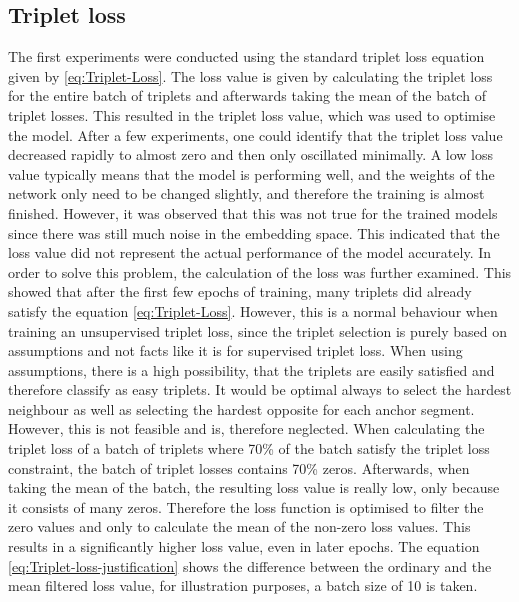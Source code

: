 \subsection{Triplet loss}
\label{sub:Results-Triplet-Loss}
The first experiments were conducted using the standard triplet loss equation given by \ref{eq:Triplet-Loss}. The loss value is given by calculating the triplet loss for the entire batch of triplets and afterwards taking the mean of the batch of triplet losses. This resulted in the triplet loss value, which was used to optimise the model. After a few experiments, one could identify that the triplet loss value decreased rapidly to almost zero and then only oscillated minimally. A low loss value typically means that the model is performing well, and the weights of the network only need to be changed slightly, and therefore the training is almost finished. However, it was observed that this was not true for the trained models since there was still much noise in the embedding space. This indicated that the loss value did not represent the actual performance of the model accurately.
\newline
\newline
In order to solve this problem, the calculation of the loss was further examined. This showed that after the first few epochs of training, many triplets did already satisfy the equation \ref{eq:Triplet-Loss}. However, this is a normal behaviour when training an unsupervised triplet loss, since the triplet selection is purely based on assumptions and not facts like it is for supervised triplet loss. When using assumptions, there is a high possibility, that the triplets are easily satisfied and therefore classify as easy triplets. It would be optimal always to select the hardest neighbour as well as selecting the hardest opposite for each anchor segment. However, this is not feasible and is, therefore neglected.
\newline
\newline
When calculating the triplet loss of a batch of triplets where 70\% of the batch satisfy the triplet loss constraint, the batch of triplet losses contains 70\% zeros. Afterwards, when taking the mean of the batch, the resulting loss value is really low, only because it consists of many zeros. Therefore the loss function is optimised to filter the zero values and only to calculate the mean of the non-zero loss values. This results in a significantly higher loss value, even in later epochs. The equation \ref{eq:Triplet-loss-justification} shows the difference between the ordinary and the mean filtered loss value, for illustration purposes, a batch size of 10 is taken.
